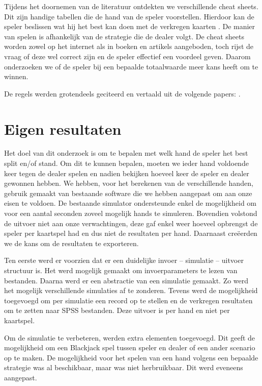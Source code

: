 \documentclass[11pt, final, journal, a4paper]{IEEEtran}
\begin{document}
Tijdens het doornemen van de literatuur ontdekten we verschillende cheat sheets. Dit zijn handige tabellen die de hand van de speler voorstellen. Hierdoor kan de speler beslissen wat hij het best kan doen met de verkregen kaarten \citep{Wong1992BasicBlackjack,van1997blackjack,fogel2004evolving,Wong1993BlackJackSecrets}. De manier van spelen is afhankelijk van de strategie die de dealer volgt. De cheat sheets worden zowel op het internet als in boeken en artikels aangeboden, toch rijst de vraag of deze wel correct zijn en de speler effectief een voordeel geven. Daarom onderzoeken we of de speler bij een bepaalde totaalwaarde meer kans heeft om te winnen.

De regels werden grotendeels geciteerd en vertaald uit de volgende papers: \cite{Wong1992BasicBlackjack, fogel2004evolving, van1997blackjack}.

\section{Eigen resultaten}
Het doel van dit onderzoek is om te bepalen met welk hand de speler het best split en/of stand. Om dit te kunnen bepalen, moeten we ieder hand voldoende keer tegen de dealer spelen en nadien bekijken hoeveel keer de speler en dealer gewonnen hebben. We hebben, voor het berekenen van de verschillende handen, gebruik gemaakt van bestaande software die we hebben aangepast om aan onze eisen te voldoen. De bestaande simulator ondersteunde enkel de mogelijkheid om voor een aantal seconden zoveel mogelijk hands te simuleren. Bovendien volstond de uitvoer niet aan onze verwachtingen, deze gaf enkel weer hoeveel opbrengst de speler per kaartspel had en dus niet de resultaten per hand. Daarnaast creëerden we de kans om de resultaten te exporteren.

Ten eerste werd er voorzien dat er een duidelijke invoer – simulatie – uitvoer structuur is. Het werd mogelijk gemaakt om invoerparameters te lezen van bestanden. Daarna werd er een abstractie van een simulatie gemaakt. Zo werd het mogelijk verschillende simulaties af te zonderen. Tevens werd de mogelijkheid toegevoegd om per simulatie een record op te stellen en de verkregen resultaten om te zetten naar SPSS bestanden. Deze uitvoer is per hand en niet per kaartspel.

Om de simulatie te verbeteren, werden extra elementen toegevoegd. Dit geeft de mogelijkheid om een Blackjack spel tussen speler en dealer of een ander scenario op te maken. De mogelijkheid voor het spelen van een hand volgens een bepaalde strategie was al beschikbaar, maar was niet herbruikbaar. Dit werd eveneens aangepast.
\end{document}
